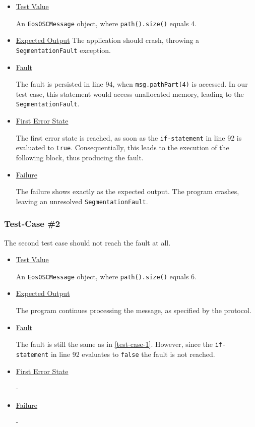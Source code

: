 \documentclass{scrreprt}
\begin{document}
\begin{itemize}
	\item[] \underline{Test Value}
	
	An \texttt{EosOSCMessage} object, where \texttt{path().size()} equals 4.
	
	\item[] \underline{Expected Output}
	The application should crash, throwing a \texttt{SegmentationFault} exception.
	
	\item[] \underline{Fault}
	
	The fault is persisted in line 94, when \texttt{msg.pathPart(4)} is accessed. In our test case, this statement would access unallocated memory, leading to the \texttt{SegmentationFault}.
	
	\item[] \underline{First Error State}
	
	The first error state is reached, as soon as the \texttt{if-statement} in line 92 is evaluated to \texttt{true}. Consequentially, this leads to the execution of the following block, thus producing the fault.
	
	\item[] \underline{Failure}
	
	The failure shows exactly as the expected output. The program crashes, leaving an unresolved \texttt{SegmentationFault}.
\end{itemize}

\subsubsection{Test-Case \#2}
\label{test-case-2}

The second test case should not reach the fault at all.

\begin{itemize}
	\item[] \underline{Test Value}
	
	An \texttt{EosOSCMessage} object, where \texttt{path().size()} equals 6.
	
	\item[] \underline{Expected Output}
	
	The program continues processing the message, as specified by the protocol.
	
	\item[] \underline{Fault}
	
	The fault is still the same as in \vref{test-case-1}. However, since the \texttt{if-statement} in line 92 evaluates to \texttt{false} the fault is not reached.
	
	\item[] \underline{First Error State}
	
	-
	
	\item[] \underline{Failure}
	
	-
\end{itemize}
\end{document}
